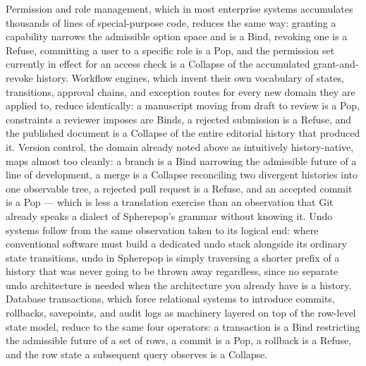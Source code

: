 \documentclass[11pt]{article}
\begin{document}
Permission and role management, which in most enterprise systems accumulates thousands of lines of special-purpose code, reduces the same way: granting a capability narrows the admissible option space and is a Bind, revoking one is a Refuse, committing a user to a specific role is a Pop, and the permission set currently in effect for an access check is a Collapse of the accumulated grant-and-revoke history. Workflow engines, which invent their own vocabulary of states, transitions, approval chains, and exception routes for every new domain they are applied to, reduce identically: a manuscript moving from draft to review is a Pop, constraints a reviewer imposes are Binds, a rejected submission is a Refuse, and the published document is a Collapse of the entire editorial history that produced it. Version control, the domain already noted above as intuitively history-native, maps almost too cleanly: a branch is a Bind narrowing the admissible future of a line of development, a merge is a Collapse reconciling two divergent histories into one observable tree, a rejected pull request is a Refuse, and an accepted commit is a Pop --- which is less a translation exercise than an observation that Git already speaks a dialect of Spherepop's grammar without knowing it. Undo systems follow from the same observation taken to its logical end: where conventional software must build a dedicated undo stack alongside its ordinary state transitions, undo in Spherepop is simply traversing a shorter prefix of a history that was never going to be thrown away regardless, since no separate undo architecture is needed when the architecture you already have is a history. Database transactions, which force relational systems to introduce commits, rollbacks, savepoints, and audit logs as machinery layered on top of the row-level state model, reduce to the same four operators: a transaction is a Bind restricting the admissible future of a set of rows, a commit is a Pop, a rollback is a Refuse, and the row state a subsequent query observes is a Collapse.
\end{document}
